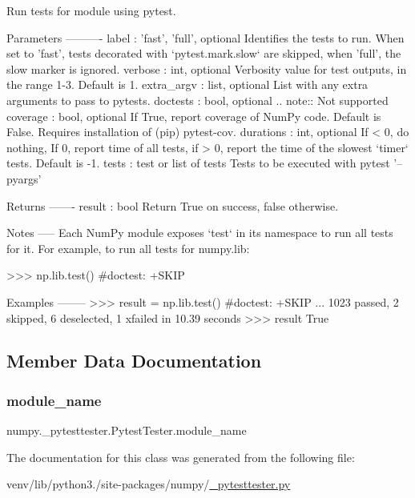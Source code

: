 \begin{DoxyVerb}Run tests for module using pytest.

Parameters
----------
label : {'fast', 'full'}, optional
    Identifies the tests to run. When set to 'fast', tests decorated
    with `pytest.mark.slow` are skipped, when 'full', the slow marker
    is ignored.
verbose : int, optional
    Verbosity value for test outputs, in the range 1-3. Default is 1.
extra_argv : list, optional
    List with any extra arguments to pass to pytests.
doctests : bool, optional
    .. note:: Not supported
coverage : bool, optional
    If True, report coverage of NumPy code. Default is False.
    Requires installation of (pip) pytest-cov.
durations : int, optional
    If < 0, do nothing, If 0, report time of all tests, if > 0,
    report the time of the slowest `timer` tests. Default is -1.
tests : test or list of tests
    Tests to be executed with pytest '--pyargs'

Returns
-------
result : bool
    Return True on success, false otherwise.

Notes
-----
Each NumPy module exposes `test` in its namespace to run all tests for
it. For example, to run all tests for numpy.lib:

>>> np.lib.test() #doctest: +SKIP

Examples
--------
>>> result = np.lib.test() #doctest: +SKIP
...
1023 passed, 2 skipped, 6 deselected, 1 xfailed in 10.39 seconds
>>> result
True\end{DoxyVerb}
 

\subsection{Member Data Documentation}
\mbox{\label{classnumpy_1_1__pytesttester_1_1PytestTester_a14050be50b2f2667302ef39c0dae5b36}} 
\subsubsection{\texorpdfstring{module\+\_\+name}{module\_name}}
{\footnotesize\ttfamily numpy.\+\_\+pytesttester.\+Pytest\+Tester.\+module\+\_\+name}



The documentation for this class was generated from the following file\+:\begin{DoxyCompactItemize}
\item 
venv/lib/python3./site-\/packages/numpy/\hyperlink{__pytesttester_8py}{\+\_\+pytesttester.\+py}\end{DoxyCompactItemize}
